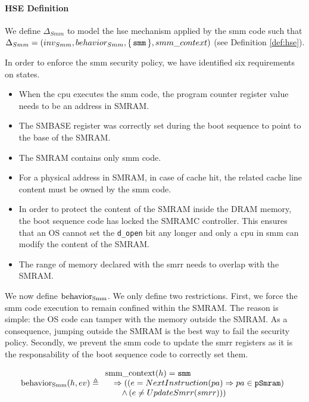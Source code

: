 \paragraph{HSE Definition}
%
We define $\Delta_{Smm}$ to model the \ac{hse} mechanism applied by the \ac{smm}
code such that
$\Delta_{Smm} = (inv_{Smm}, behavior_{Smm}, \{\,\mathtt{smm}\,\},
smm\_context)$ (see Definition \ref{def:hse}).

In order to enforce the \ac{smm} security policy, we have identified six
requirements on states.
\begin{itemize}
\item When the \ac{cpu} executes the \ac{smm} code, the program counter register
  value needs to be an address in SMRAM.
\item The SMBASE register was correctly set during the boot sequence to point to
  the base of the SMRAM.
\item The SMRAM contains only \ac{smm} code.
\item For a physical address in SMRAM, in case of cache hit, the related cache
  line content must be owned by the \ac{smm} code.
\item In order to protect the content of the SMRAM inside the DRAM memory, the
  boot sequence code has locked the SMRAMC controller. This ensures that an OS
  cannot set the \texttt{d\_open} bit any longer and only a \ac{cpu} in \ac{smm}
  can modify the content of the SMRAM.
\item The range of memory declared with the \ac{smrr} needs to overlap with the
  SMRAM.
\end{itemize}


We now define $\mathrm{behavior_{Smm}}$.
%
We only define two restrictions.
%
First, we force the \ac{smm} code execution to remain confined within the SMRAM.
%
The reason is simple: the OS code can tamper with the memory outside the SMRAM.
%
As a consequence, jumping outside the SMRAM is the best way to fail the security
policy.
%
Secondly, we prevent the \ac{smm} code to update the \ac{smrr} registers as it
is the responsability of the boot sequence code to correctly set them.

\[
  \mathrm{behavior_{Smm}}(h, ev) \triangleq
  \begin{array}{l}
    \mathrm{smm\_context}(h) = \mathtt{smm} \\
    \quad \Rightarrow ((e =
    NextInstruction(pa)
    \Rightarrow pa \in \texttt{pSmram}) \\
    \qquad \wedge\,(e \neq UpdateSmrr(smrr))) \\
  \end{array}
\]


